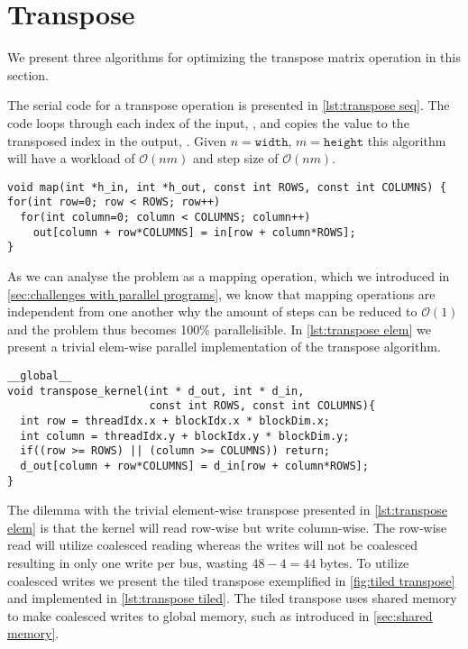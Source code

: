 \section{Transpose}
\label{sec:transpose}

We present three algorithms for optimizing the transpose matrix operation in this section.

The serial code for a transpose operation is presented in \cref{lst:transpose seq}.
The code loops through each index of the input, , and copies the value to the transposed index in the output, .
Given $n=\mathtt{width}$, $m=\mathtt{height}$ this algorithm will have a workload of $\mathcal{O}(nm)$ and step size of $\mathcal{O}(nm)$.

\begin{lstlisting}[caption={Serial transpose}, label={lst:transpose seq}]
void map(int *h_in, int *h_out, const int ROWS, const int COLUMNS) {
for(int row=0; row < ROWS; row++)
  for(int column=0; column < COLUMNS; column++)
    out[column + row*COLUMNS] = in[row + column*ROWS];
}
\end{lstlisting}

As we can analyse the problem as a mapping operation, which we introduced in \cref{sec:challenges with parallel programs}, we know that mapping operations are independent from one another why the amount of steps can be reduced to $\mathcal{O}(1)$ and the problem thus becomes 100\% parallelisible.
In \cref{lst:transpose elem} we present a trivial elem-wise parallel implementation of the transpose algorithm.

\begin{lstlisting}[caption={Parallel transpose}, label={lst:transpose elem}]
__global__
void transpose_kernel(int * d_out, int * d_in,
                      const int ROWS, const int COLUMNS){
  int row = threadIdx.x + blockIdx.x * blockDim.x;
  int column = threadIdx.y + blockIdx.y * blockDim.y;
  if((row >= ROWS) || (column >= COLUMNS)) return;
  d_out[column + row*COLUMNS] = d_in[row + column*ROWS];
}
\end{lstlisting}

The dilemma with the trivial element-wise transpose presented in \cref{lst:transpose elem} is that the kernel will read row-wise but write column-wise.
The row-wise read will utilize coalesced reading whereas the writes will not be coalesced resulting in only one write per bus, wasting $48-4=44$ bytes.
To utilize coalesced writes we present the tiled transpose exemplified in \cref{fig:tiled transpose} and implemented in \cref{lst:transpose tiled}.
The tiled transpose uses shared memory to make coalesced writes to global memory, such as introduced in \cref{sec:shared memory}.

